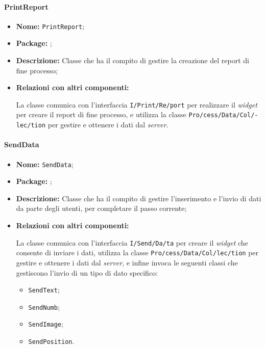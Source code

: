 \paragraph{PrintReport}
\begin{flushleft}
\begin{itemize}
\item \textbf{Nome:} \texttt{PrintReport};
\item \textbf{Package:} \texttt{\logicUser};
\item \textbf{Descrizione:} Classe che ha il compito di gestire la creazione del report di fine processo;
\item \textbf{Relazioni con altri componenti:}
\begin{sloppypar}
La classe comunica con l'interfaccia \texttt{\logicUser{}I\fshyp{}Print\fshyp{}Re\fshyp{}port} per realizzare il \textit{widget} per creare il report di fine processo, e utilizza la classe \texttt{\collection{}Pro\fshyp{}cess\fshyp{}Data\fshyp{}Col\fshyp{}lec\fshyp{}tion} per gestire e ottenere i dati dal \textit{server}.
\end{sloppypar}
\end{itemize}
\end{flushleft}

\paragraph{SendData}
\begin{flushleft}
\begin{itemize}
\item \textbf{Nome:} \texttt{SendData};
\item \textbf{Package:} \texttt{\logicUser};
\item \textbf{Descrizione:} Classe che ha il compito di gestire l'inserimento e l'invio di dati da parte degli utenti, per completare il passo corrente;
\item \textbf{Relazioni con altri componenti:}
\begin{sloppypar}
La classe comunica con l'interfaccia \texttt{\logicUser{}I\fshyp{}Send\fshyp{}Da\fshyp{}ta} per creare il \textit{widget} che consente di inviare i dati, utilizza la classe \texttt{\collection{}Pro\fshyp{}cess\fshyp{}Data\fshyp{}Col\fshyp{}lec\fshyp{}tion} per gestire e ottenere i dati dal \textit{server}, e infine invoca le seguenti classi che gestiscono l'invio di un tipo di dato specifico:
\begin{itemize}
	\item \texttt{\logicUser{}SendText};
	\item \texttt{\logicUser{}SendNumb};
	\item \texttt{\logicUser{}SendImage};
	\item \texttt{\logicUser{}SendPosition}.
\end{itemize}
\end{sloppypar}
\end{itemize}
\end{flushleft}

